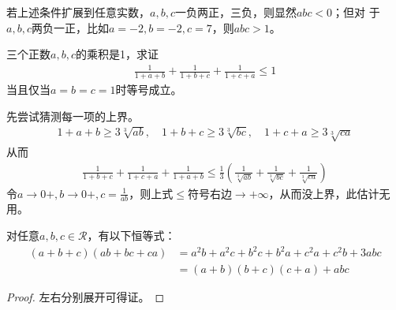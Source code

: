 若上述条件扩展到任意实数，$a,b,c$一负两正，三负，则显然$abc<0$；但对
于$a,b,c$两负一正，比如$a=-2,b=-2,c=7$，则$abc>1$。



\begin{question}\label{q:1/1+a+b}
  三个正数$a,b,c$的乘积是1，求证
  \begin{align*}
    \frac1{1+a+b} + \frac1{1+b+c} + \frac1{1+c+a} \le 1
  \end{align*}
  当且仅当$a=b=c=1$时等号成立。
\end{question}

先尝试猜测每一项的上界。
\begin{align*}
  1+a+b\ge 3\sqrt[3]{ab},\quad 1+b+c \ge 3\sqrt[3]{bc},\quad 1+c+a\ge 3\sqrt[3]{ca}
\end{align*}
从而
\begin{align*}
  \frac1{1+b+c} + \frac1{1+c+a} + \frac1{1+a+b} \le
  \frac13\left( \frac1{\sqrt[3]{ab}} + \frac1{\sqrt[3]{bc}} + \frac1{\sqrt[3]{ca}} \right)
\end{align*}
令$a\to0+, b\to 0+, c=\frac1{ab}$，则上式$\le$符号右边$\to+\infty$，从而没上界，此估计无用。




\begin{lemma}
对任意$a,b,c\in\mathcal{R}$，有以下恒等式：
\begin{align*}
  (a+b+c)(ab+bc+ca)&=a^2b+a^2c+b^2c+b^2a+c^2a+c^2b + 3abc\\
                   &=(a+b)(b+c)(c+a)+abc
\end{align*}
\end{lemma}
\begin{proof}
  左右分别展开可得证。
\end{proof}

